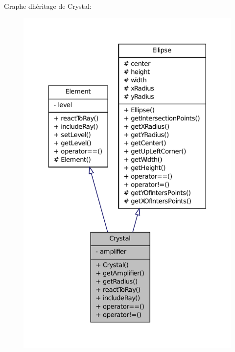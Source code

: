 Graphe d\textquotesingle{}héritage de Crystal\+:\nopagebreak
\begin{figure}[H]
\begin{center}
\leavevmode
\includegraphics[width=326pt]{de/da2/classCrystal__inherit__graph}
\end{center}
\end{figure}


